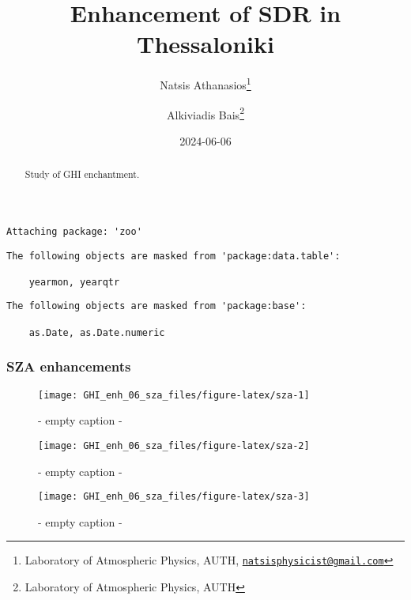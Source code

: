 \documentclass[
  10pt,
  a4paper,oneside]{article}
\title{Enhancement of SDR in Thessaloniki}
\author{Natsis Athanasios\footnote{Laboratory of Atmospheric Physics, AUTH, \href{mailto:natsisphysicist@gmail.com}{\nolinkurl{natsisphysicist@gmail.com}}} \and Alkiviadis Bais\footnote{Laboratory of Atmospheric Physics, AUTH}}
\date{2024-06-06}
\begin{document}
\maketitle
\begin{abstract}
Study of GHI enchantment.
\end{abstract}

{
\hypersetup{linkcolor=}
\setcounter{tocdepth}{4}
\tableofcontents
}
\begin{verbatim}
Attaching package: 'zoo'
\end{verbatim}

\begin{verbatim}
The following objects are masked from 'package:data.table':

    yearmon, yearqtr
\end{verbatim}

\begin{verbatim}
The following objects are masked from 'package:base':

    as.Date, as.Date.numeric
\end{verbatim}

\newpage
\FloatBarrier

\hypertarget{sza-enhancements}{%
\subsubsection{SZA enhancements}\label{sza-enhancements}}

\begin{figure}[H]

{\centering \texttt{[image: GHI\_enh\_06\_sza\_files/figure-latex/sza-1]} 

}

\caption{ - empty caption - }\label{fig:sza-1}
\end{figure}
\begin{figure}[H]

{\centering \texttt{[image: GHI\_enh\_06\_sza\_files/figure-latex/sza-2]} 

}

\caption{ - empty caption - }\label{fig:sza-2}
\end{figure}
\begin{figure}[H]

{\centering \texttt{[image: GHI\_enh\_06\_sza\_files/figure-latex/sza-3]} 

}

\caption{ - empty caption - }\label{fig:sza-3}
\end{figure}
\end{document}
